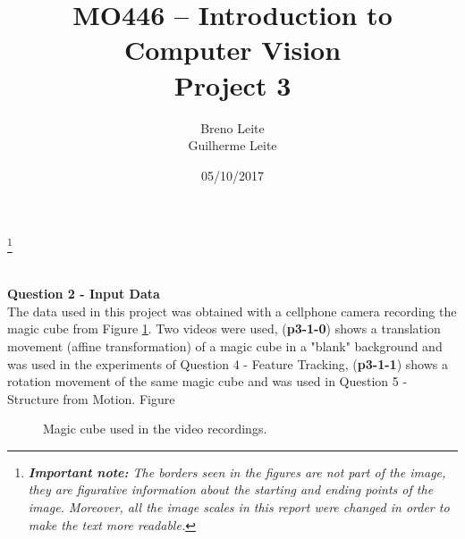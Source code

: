 \documentclass[12pt,a4paper]{article}
\title{MO446 -- Introduction to Computer Vision  \\ Project 3}
\author{Breno Leite  \\ Guilherme Leite}
\date{05/10/2017}
\newcommand\blfootnote[1]{%
	\begingroup
	\renewcommand\thefootnote{}\footnote{#1}%
	\addtocounter{footnote}{-1}%
	\endgroup
}
\begin{document}
\maketitle
\blfootnote{\textit{\textbf{Important note:} The borders seen in the figures are not part of the image, they are figurative information about the starting and ending points of the image. Moreover, all the image scales in this report were changed in order to make the text more readable.}} \\


\textbf{\LARGE Question 2 - Input Data} \\

	The data used in this project was obtained with a cellphone camera recording the magic cube from Figure \ref{fig:magicCube}. Two videos were used, (\textbf{p3-1-0}) shows a translation movement  (affine transformation) of a magic cube in a "blank" background and was used in the experiments of Question 4 - Feature Tracking, (\textbf{p3-1-1}) shows a rotation movement of the same magic cube and was used in Question 5 - Structure from Motion. Figure\\

\begin{figure}[!h]
	\centering
	{
		\setlength{\fboxsep}{1pt}
		\setlength{\fboxrule}{1pt}
	}
	\caption{Magic cube used in the video recordings.}
	\label{fig:magicCube}
\end{figure}
\end{document}
